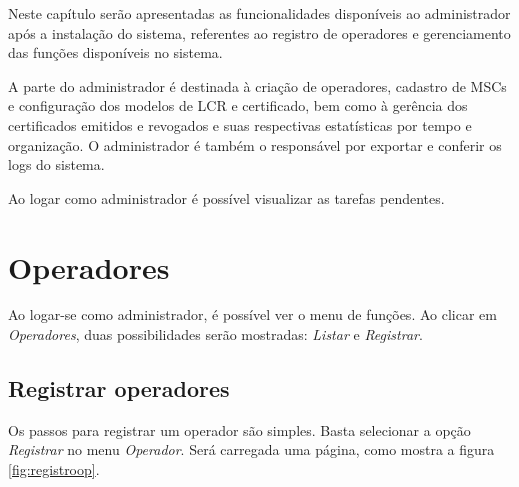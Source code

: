 
Neste capítulo serão apresentadas as funcionalidades disponíveis ao administrador após a instalação do sistema, referentes ao registro de operadores e gerenciamento das funções disponíveis no sistema.

A parte do administrador é destinada à criação de operadores, cadastro de MSCs e configuração dos modelos de LCR e certificado, bem como à gerência dos certificados emitidos e revogados e suas respectivas estatísticas por tempo e organização. O administrador é também o responsável por exportar e conferir os logs do sistema.

Ao logar como administrador é possível visualizar as tarefas pendentes.

\section{Operadores}\label{sec:operadores}

Ao logar-se como administrador, é possível ver o menu de funções. Ao clicar em \textit{Operadores}, duas possibilidades serão mostradas: \textit{Listar} e \textit{Registrar}.


\subsection{Registrar operadores}\label{subsec:cadEntidades}

Os passos para registrar um operador são simples. Basta selecionar a opção \textit{Registrar} no menu \textit{Operador}. Será carregada uma página, como mostra a figura \ref{fig:registroop}.

